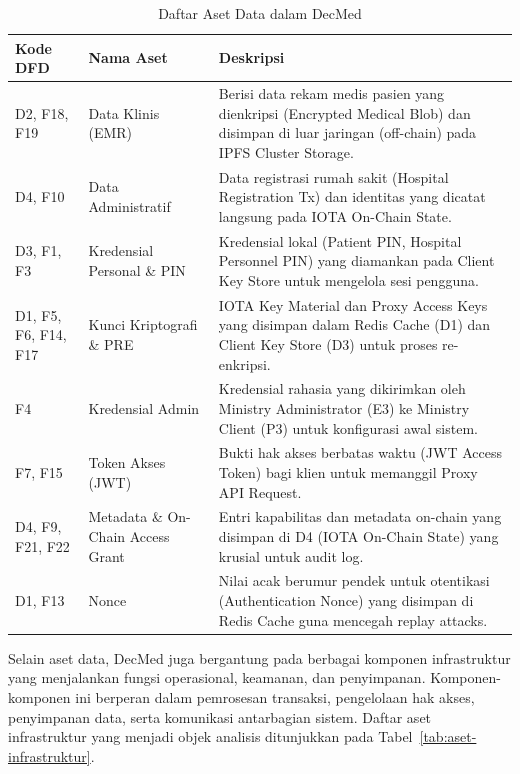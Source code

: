 \begin{table}[htbp]
    \centering
    \caption{Daftar Aset Data dalam DecMed}
    \vspace{0.25cm}
    \label{tab:aset-data}
    \begin{tabular}{|p{2.5cm}|p{3.5cm}|p{8cm}|}
        \hline
        \textbf{Kode DFD} & \textbf{Nama Aset} & \textbf{Deskripsi} \\
        \hline
        D2, F18, F19 & Data Klinis (EMR) & Berisi data rekam medis pasien yang dienkripsi (Encrypted Medical Blob) dan disimpan di luar jaringan (off-chain) pada IPFS Cluster Storage. \\
        \hline
        D4, F10 & Data Administratif & Data registrasi rumah sakit (Hospital Registration Tx) dan identitas yang dicatat langsung pada IOTA On-Chain State. \\
        \hline
        D3, F1, F3 & Kredensial Personal \& PIN & Kredensial lokal (Patient PIN, Hospital Personnel PIN) yang diamankan pada Client Key Store untuk mengelola sesi pengguna. \\
        \hline
        D1, F5, F6, F14, F17 & Kunci Kriptografi \& PRE & IOTA Key Material dan Proxy Access Keys yang disimpan dalam Redis Cache (D1) dan Client Key Store (D3) untuk proses re-enkripsi. \\
        \hline
        F4 & Kredensial Admin & Kredensial rahasia yang dikirimkan oleh Ministry Administrator (E3) ke Ministry Client (P3) untuk konfigurasi awal sistem. \\
        \hline
        F7, F15 & Token Akses (JWT) & Bukti hak akses berbatas waktu (JWT Access Token) bagi klien untuk memanggil Proxy API Request. \\
        \hline
        D4, F9, F21, F22 & Metadata \& On-Chain Access Grant & Entri kapabilitas dan metadata on-chain yang disimpan di D4 (IOTA On-Chain State) yang krusial untuk audit log. \\
        \hline
        D1, F13 & Nonce & Nilai acak berumur pendek untuk otentikasi (Authentication Nonce) yang disimpan di Redis Cache guna mencegah replay attacks. \\
        \hline
    \end{tabular}
\end{table}

Selain aset data, DecMed juga bergantung pada berbagai komponen infrastruktur yang menjalankan fungsi operasional, keamanan, dan penyimpanan. Komponen-komponen ini berperan dalam pemrosesan transaksi, pengelolaan hak akses, penyimpanan data, serta komunikasi antarbagian sistem. Daftar aset infrastruktur yang menjadi objek analisis ditunjukkan pada Tabel~\ref{tab:aset-infrastruktur}.

